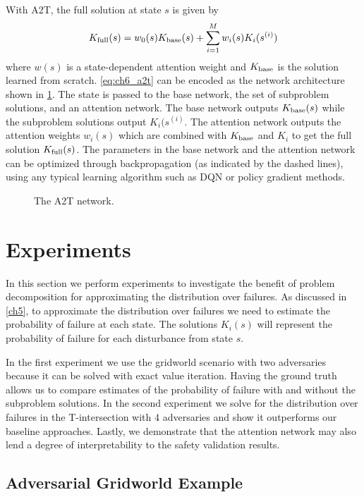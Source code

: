 With A2T, the full solution at state $s$ is given by 
\begin{equation}
K_{\rm full}(s) = w_0(s) K_{\rm base}(s) + \sum_{i=1}^M w_i(s) K_i(s^{(i)}) \label{eq:ch6_a2t}
\end{equation}
where $w(s)$ is a state-dependent attention weight and $K_{\rm base}$ is the solution learned from scratch. \cref{eq:ch6_a2t} can be encoded as the network architecture shown in \cref{fig:ch6_A2T_Network}. The state is passed to the base network, the set of subproblem solutions, and an attention network. The base network outputs $K_{\rm base}(s)$ while the subproblem solutions output $K_i(s^{(i)}$. The attention network outputs the attention weights $w_i(s)$ which are combined with $K_{\rm base}$ and $K_i$ to get the full solution $K_{\rm full}(s)$. The parameters in the base network and the attention network can be optimized through backpropagation (as indicated by the dashed lines), using any typical learning algorithm such as DQN or policy gradient methods.

\begin{figure}[!t]
\centering

\caption{The A2T network. }
\label{fig:ch6_A2T_Network}
\end{figure}


\section{Experiments}

In this section we perform experiments to investigate the benefit of problem decomposition for approximating the distribution over failures. As discussed in \cref{ch5}, to approximate the distribution over failures we need to estimate the probability of failure at each state. The solutions $K_i(s)$ will represent the probability of failure for each disturbance from state $s$. 

In the first experiment we use the gridworld scenario with two adversaries because it can be solved with exact value iteration. Having the ground truth allows us to compare estimates of the probability of failure with and without the subproblem solutions. In the second experiment we solve for the distribution over failures in the T-intersection with \num{4} adversaries and show it outperforms our baseline approaches. Lastly, we demonstrate that the attention network may also lend a degree of interpretability to the safety validation results. 

\subsection{Adversarial Gridworld Example}

